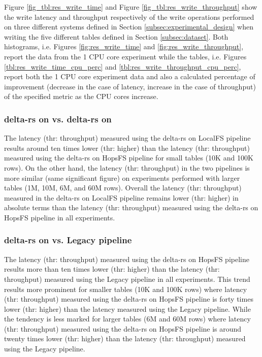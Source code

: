 Figure \ref{fig_tbl:res_write_time} and Figure \ref{fig_tbl:res_write_throughput} show the write latency and throughput respectively of the write operations performed on three different systems defined in Section \ref{subsec:experimental_design} when writing the five different tables defined in Section \ref{subsec:dataset}. Both histograms, i.e. Figures \ref{fig:res_write_time} and \ref{fig:res_write_throughput}, report the data from the 1 \gls{CPU} core experiment while the tables, i.e. Figures \ref{tbl:res_write_time_cpu_perc} and \ref{tbl:res_write_throughput_cpu_perc}, report both the 1 \gls{CPU} core experiment data and also a calculated percentage of improvement (decrease in the case of latency, increase in the case of throughput) of the specified metric as the \gls{CPU} cores increase.

\subsubsection*{delta-rs on  vs. delta-rs on }

The latency (thr: throughput) measured using the delta-rs on \gls{LocalFS} pipeline results around ten times lower (thr: higher) than the latency (thr: throughput) measured using the delta-rs on \gls{HopsFS} pipeline for small tables (10K and 100K rows). On the other hand, the latency (thr: throughput) in the two pipelines is more similar (same significant figure) on experiments performed with larger tables (1M, 10M, 6M, and 60M rows). Overall the latency (thr: throughput) measured in the delta-rs on \gls{LocalFS} pipeline remains lower (thr: higher) in absolute terms than the latency (thr: throughput) measured using the delta-rs on \gls{HopsFS} pipeline in all experiments.

\subsubsection*{delta-rs on  vs. Legacy pipeline}

The latency (thr: throughput) measured using the delta-rs on \gls{HopsFS} pipeline results more than ten times lower (thr: higher) than the latency (thr: throughput) measured using the Legacy pipeline in all experiments. This trend results more prominent for smaller tables (10K and 100K rows) where latency (thr: throughput) measured using the delta-rs on \gls{HopsFS} pipeline is forty times lower (thr: higher) than the latency measured using the Legacy pipeline. While the tendency is less marked for larger tables (6M and 60M rows) where latency (thr: throughput) measured using the delta-rs on \gls{HopsFS} pipeline is around twenty times lower (thr: higher) than the latency (thr: throughput) measured using the Legacy pipeline.


